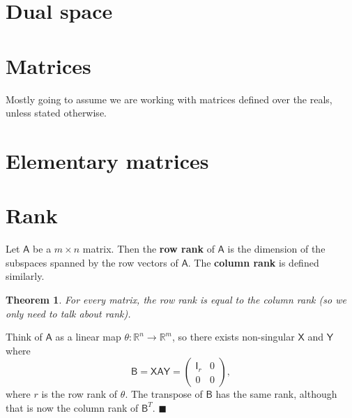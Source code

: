 \documentclass[letter-paper]{tufte-book}
\newtheorem{theorem}{\color{pastel-blue}Theorem}[section]
\newenvironment{proof}[1][Proof]{\begin{trivlist}
\item[\hskip \labelsep {\bfseries #1}]}{\end{trivlist}}
\newcommand{\As}{{\mathsf{A}}}
\newcommand{\Bs}{{\mathsf{B}}}
\newcommand{\Is}{{\mathsf{I}}}
\newcommand{\Xs}{{\mathsf{X}}}
\newcommand{\Ys}{{\mathsf{Y}}}
\newcommand{\qed}{\hfill$\blacksquare$}
\begin{document}

\section{Dual space}


\section{Matrices}

Mostly going to assume we are working with matrices defined over the reals,
unless stated otherwise.


\section{Elementary matrices}


\section{Rank}

Let $\As$ be a $m\times n$ matrix. Then the \textbf{row rank} of $\As$ is the
dimension of the subspaces spanned by the row vectors of $\As$. The
\textbf{column rank} is defined similarly.

\begin{theorem}
  For every matrix, the row rank is equal to the column rank (so we only need to
  talk about \emph{rank}).
\end{theorem}

\begin{proof}
  Think of $\As$ as a linear map $\theta: \mathbb{R}^n \to \mathbb{R}^m$, so
  there exists non-singular $\Xs$ and $\Ys$ where
  \begin{equation*}
    \Bs = \Xs \As \Ys = \begin{pmatrix}\Is_r & 0 \\ 0 & 0 \end{pmatrix},
  \end{equation*}
  where $r$ is the row rank of $\theta$. The transpose of $\Bs$ has the same
  rank, although that is now the column rank of $\Bs^T$. \qed
\end{proof}
\end{document}
